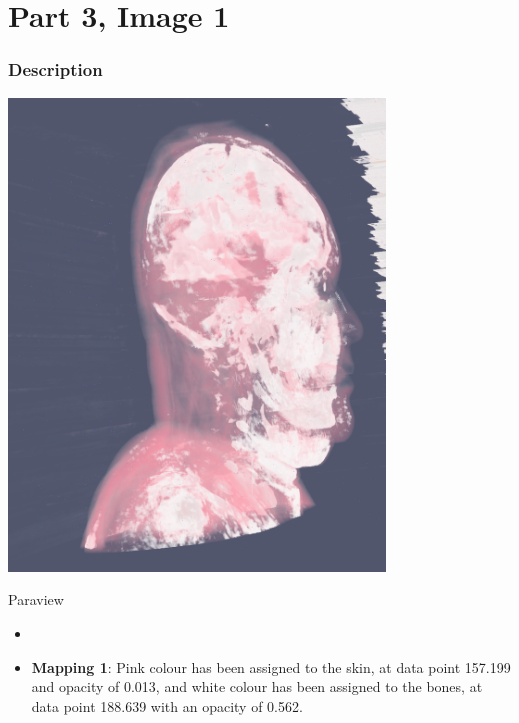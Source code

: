 \hypertarget{part-3-image-1}{%
	\section{Part 3, Image 1}\label{part-1-design-4}}


\centering


\hypertarget{description}{%
	\subsubsection{Description}\label{description}}

\begin{description}
	\item[Image:]
	\item\includegraphics[width=10cm]{Head1.png}
	
	\item[Tool:]
	\hfill \break
		Paraview
	\item[Visual Mappings:]
	
	\begin{itemize}
		\tightlist
		\item[ ]
	\end{itemize}
	
	\begin{itemize}
		\tightlist
		\item
		\textbf{Mapping 1}: 
		\hfill \break
			Pink colour has been assigned to the skin, at data point 157.199 and opacity of 0.013, and white colour has been assigned to the bones, at data point 188.639 with an opacity of 0.562.
	\end{itemize}
	

\end{description}
